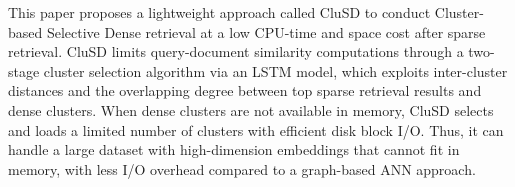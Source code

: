 This paper proposes a lightweight approach called CluSD to 
conduct Cluster-based Selective Dense retrieval at a low CPU-time and space cost after sparse retrieval. 
CluSD limits query-document similarity computations through a two-stage cluster selection algorithm via an LSTM model, which  
exploits inter-cluster distances and the overlapping degree between top sparse retrieval results and dense clusters.
When dense clusters are not available in memory, CluSD selects and loads a limited number of clusters with efficient disk block I/O.
Thus, it can handle a large dataset with high-dimension embeddings that cannot fit in memory, with less I/O overhead compared to a
graph-based ANN approach.  %






















